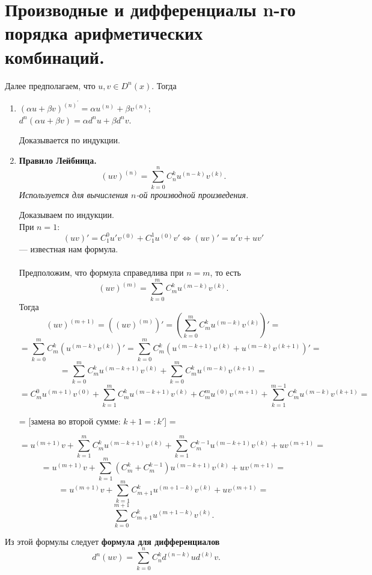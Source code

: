 \section{Производные и дифференциалы n-го порядка арифметических комбинаций.}
Далее предполагаем, что $u, v \in D^n(x)$. Тогда
\begin{enumerate}
	\item $(\alpha u + \beta v)^{(n)^\prime} = \alpha u^{(n)} + \beta v^{(n)};$\\
	$d^n(\alpha u + \beta v) = \alpha d^nu + \beta d^nv.$
	\begin{Proof}
		Доказывается по индукции.
	\end{Proof}
	\item \textbf{Правило Лейбница.}
	$$(uv)^{(n)} = \sum^n_{k = 0} C^k_n u^{(n-k)} v^{(k)}.$$
	\textit{Используется для вычисления $n$-ой производной произведения.}
	\begin{Proof}
		Доказываем по индукции.\\
		При $n=1$:  
		$$(uv)' = C^0_1 u' v^{(0)} + C^1_1 u^{(0)} v' \Leftrightarrow (uv)' = u'v + uv'$$ --- известная нам формула. \\\\
		Предположим, что формула справедлива при $n = m$, то есть 
		$$(uv)^{(m)} = \sum^m_{k = 0} C^k_m u^{(m-k)} v^{(k)}.$$
		Тогда $$(uv)^{(m+1)} =((uv)^{(m)})' = (\sum^m_{k = 0} C^k_m  u^{(m-k)} v^{(k)})' = $$ 
		$$= \sum^m_{k = 0} C^k_m (u^{(m-k)} v^{(k)})' = \sum^m_{k = 0} C^k_m (u^{(m-k+1)} v^{(k)} + u^{(m-k)} v^{(k+1)})' = $$ 
		$$= \sum^m_{k = 0} C^k_m u^{(m-k+1)} v^{(k)} + \sum^m_{k = 0} C^k_mu^{(m-k)} v^{(k+1)} =$$ 
		$$= C^0_m u^{(m+1)} v^{(0)} + \sum^m_{k = 1} C^k_mu^{(m-k+1)} v^{(k)} +
		C^m_m u^{(0)} v^{(m+1)} + \sum^{m-1}_{k = 1} C^k_mu^{(m-k)} v^{(k+1)} =$$
		\begin{center}
			= [замена во второй сумме: $k + 1 =: k'$] =
		\end{center}
		$$= u^{(m+1)} v + \sum^m_{k = 1} C^k_mu^{(m-k+1)} v^{(k)} +
		\sum^{m}_{k = 1} C^{k - 1}_m u^{(m-k+1)} v^{(k)} + u v^{(m+1)} =$$ 
		$$= u^{(m+1)} v + \sum^m_{k = 1}(C^{k}_m + C^{k - 1}_m) u^{(m-k+1)}v^{(k)} + u v^{(m+1)} = $$
		$$ = u^{(m+1)} v + \sum^m_{k = 1}C^{k}_{m + 1} u^{(m+1-k)} v^{(k)} + u v^{(m+1)} = $$
		$$ \sum^{m + 1}_{k = 0}C^{k}_{m + 1} u^{(m+1-k)} v^{(k)}.$$
	\end{Proof}
\end{enumerate}
Из этой формулы следует \textbf{формула для дифференциалов }
$$ d^n(uv) = \sum^{n}_{k = 0}C^{k}_{n} d^{(n - k)} u d^{(k)}v.$$

